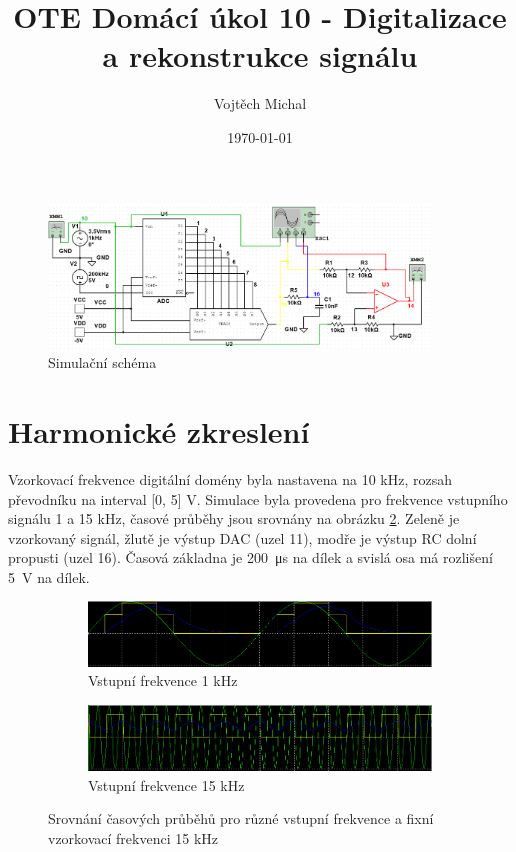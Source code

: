 \documentclass[twoside]{article}
\title{OTE Domácí úkol 10 - Digitalizace a rekonstrukce signálu}
\author{Vojtěch Michal}
\date{\today}
\begin{document}
\maketitle

\begin{figure}[h]
    \centering
    \includegraphics[width=0.9\textwidth]{schema.png}
    \caption{Simulační schéma}
    \label{schema}
\end{figure}

\section{Harmonické zkreslení}
Vzorkovací frekvence digitální domény byla nastavena na 10 kHz,
rozsah převodníku na interval [0, 5] V.
Simulace byla provedena pro frekvence vstupního signálu 1 a 15 kHz,
časové průběhy jsou srovnány na obrázku \ref{time-domain}.
Zeleně je vzorkovaný signál, žlutě je výstup DAC (uzel 11), modře je
výstup RC dolní propusti (uzel 16). Časová základna je \SI{200}{\micro\second}
na dílek a svislá osa má rozlišení \SI{5}{\volt} na dílek.

\begin{figure}[h]
    \begin{subfigure}{\textwidth}
        \includegraphics[width=\textwidth]{time-domain-1khz.png}
        \caption{Vstupní frekvence 1 kHz}
    \end{subfigure}

    \begin{subfigure}{\textwidth}
        \includegraphics[width=\textwidth]{time-domain-15khz.png}
        \caption{Vstupní frekvence 15 kHz}
    \end{subfigure}
    \caption{Srovnání časových průběhů pro různé vstupní frekvence a fixní vzorkovací frekvenci 15 kHz}
    \label{time-domain}
\end{figure}
\end{document}

